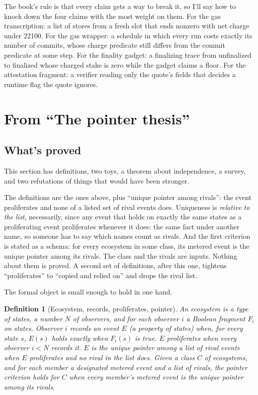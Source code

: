 \documentclass[11pt,twoside]{article}
\theoremstyle{thielethm}
\theoremstyle{thieledef}
\newtheorem{definition}{Definition}[section]
\theoremstyle{thieledef}
\theoremstyle{thieledef}
\theoremstyle{thielethm}
\theoremstyle{thieleobs}
\theoremstyle{thielethm}
\begin{document}
The book's rule is that every claim gets a way to break it, so I'll say how to knock down the four claims with the most weight on them.
For the gas transcription: a list of stores from a fresh slot that ends nonzero with net charge under 22100. For the gas wrapper: a schedule in which every run costs exactly its number of commits, whose charge predicate still differs from the commit predicate at some step. For the finality gadget: a finalizing trace from unfinalized to finalized whose
charged stake is zero while the gadget claims a floor. For the attestation fragment: a
verifier reading only the quote's fields that decides a runtime flag the quote ignores.


\section{From ``The pointer thesis''}
\subsection{What's proved}

This section has definitions, two toys, a theorem about independence, a survey, and two refutations of things that would have been stronger.

The definitions are the ones above, plus ``unique pointer among rivals'': the event proliferates and none
of a listed set of rival events does. Uniqueness is \emph{relative to the list}, necessarily,
since any event that holds on exactly the same states as a proliferating event proliferates
whenever it does: the same fact under another name, so someone has to say which names count
as rivals. And the first criterion is stated
as a schema: for every ecosystem in some class, its metered event is the unique pointer among
its rivals. The class and the rivals are inputs. Nothing about them is proved. A second set of
definitions, after this one, tightens ``proliferates'' to ``copied and relied on'' and drops the
rival list.

The formal object is small enough to hold in one hand.

\begin{definition}[Ecosystem, records, proliferates, pointer]\label{def:u14-ecosystem}
An \emph{ecosystem} is a type of states, a number $N$ of observers, and for each observer $i$ a
Boolean fragment $F_i$ on states. Observer $i$ \emph{records} an event $E$ (a property of states)
when, for every state $s$, $E(s)$ holds exactly when $F_i(s)$ is true. $E$ \emph{proliferates} when
every observer $i < N$ records it. $E$ is the \emph{unique pointer among} a list of rival events
when $E$ proliferates and no rival in the list does. Given a class $C$ of ecosystems, and for
each member a designated metered event and a list of rivals, the \emph{pointer criterion holds}
for $C$ when every member's metered event is the unique pointer among its rivals.
\end{definition}
\end{document}
